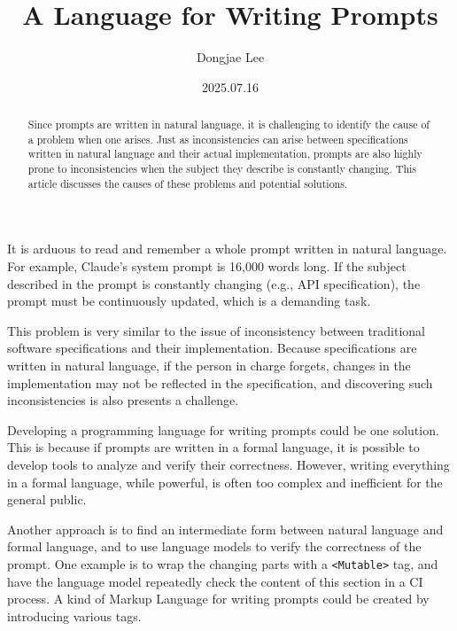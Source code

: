 \documentclass[11pt, oneside]{article}
\title{A Language for Writing Prompts}
\author{Dongjae Lee}
\date{2025.07.16}
\begin{document}
\maketitle

\begin{abstract}
	Since prompts are written in natural language, it is challenging to identify the cause of a problem when one arises.
	Just as inconsistencies can arise between specifications written in natural language and their actual implementation, prompts are also highly prone to inconsistencies when the subject they describe is constantly changing.
	This article discusses the causes of these problems and potential solutions.
\end{abstract}

It is arduous to read and remember a whole prompt written in natural language. For example, Claude's system prompt is 16,000 words long.
If the subject described in the prompt is constantly changing (e.g., API specification), the prompt must be continuously updated, which is a demanding task.

This problem is very similar to the issue of inconsistency between traditional software specifications and their implementation.
Because specifications are written in natural language, if the person in charge forgets, changes in the implementation may not be reflected in the specification, and discovering such inconsistencies is also presents a challenge.

Developing a programming language for writing prompts could be one solution.
This is because if prompts are written in a formal language, it is possible to develop tools to analyze and verify their correctness.
However, writing everything in a formal language, while powerful, is often too complex and inefficient for the general public.

Another approach is to find an intermediate form between natural language and formal language, and to use language models to verify the correctness of the prompt.
One example is to wrap the changing parts with a \texttt{<Mutable>} tag, and have the language model repeatedly check the content of this section in a CI process.
A kind of Markup Language for writing prompts could be created by introducing various tags.
\end{document}
